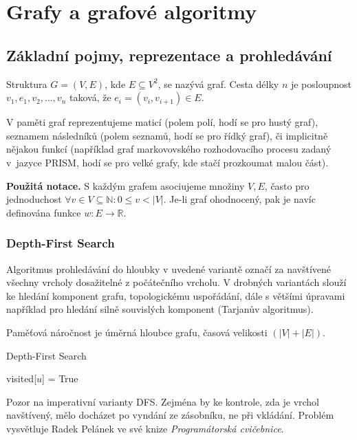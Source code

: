 \section{Grafy a grafové algoritmy}

\subsection{Základní pojmy, reprezentace a prohledávání}

Struktura $G = (V, E)$, kde $E \subseteq V^2$, se nazývá graf.
Cesta délky $n$ je posloupnost $v_1,e_1,v_2,\ldots,v_n$ taková, že $e_i
= (v_i, v_{i+1}) \in E$.

V paměti graf reprezentujeme maticí (polem polí, hodí se pro hustý
graf), seznamem následníků (polem seznamů, hodí se pro řídký graf), či
implicitně nějakou funkcí (například graf markovovského rozhodovacího
procesu zadaný v~jazyce PRISM, hodí se pro velké grafy, kde stačí
prozkoumat malou část).

\bigskip
\noindent
\textbf{Použitá notace.} S každým grafem asociujeme množiny $V, E$,
často pro jednoduchost
$\forall v \in V \subseteq \mathbb{N} : 0 \leq v < \lvert V \rvert$.
Je-li graf ohodnocený, pak je navíc definována funkce $w : E \to
\mathbb{R}$.

\subsubsection*{Depth-First Search}

Algoritmus prohledávání do hloubky v uvedené variantě označí za
navštívené všechny vrcholy dosažitelné z počátečního vrcholu. V drobných
variantách slouží ke hledání komponent grafu, topologickému uspořádání,
dále s většími úpravami například pro hledání silně souvislých komponent
(Tarjanův algoritmus).

Paměťová náročnost je úměrná hloubce grafu, časová velikosti
$(\lvert V \rvert + \lvert E \rvert)$.

\begin{algorithm}
\caption{Depth-First Search}
\begin{algorithmic}[1]
    \State visited[$u$] = True
            \State {}
        \EndIf
    \EndFor
\EndFunction
\end{algorithmic}
\end{algorithm}

Pozor na  imperativní varianty DFS. Zejména by ke kontrole,
zda je vrchol navštívený, mělo docházet po vyndání ze zásobníku, ne při
vkládání.
Problém vysvětluje Radek Pelánek ve své knize {\em Programátorská
cvičebnice}.


